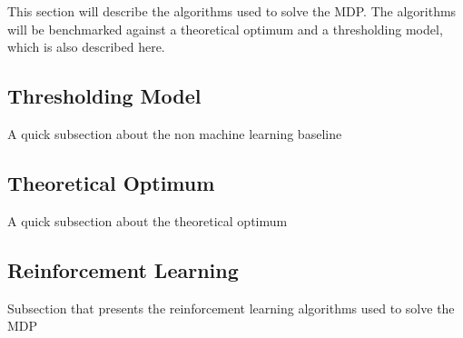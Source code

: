
This section will describe the algorithms used to solve the MDP. The algorithms will be benchmarked against a theoretical optimum and a thresholding model, which is also described here.
\subsection{Thresholding Model}
A quick subsection about the non machine learning baseline
\subsection{Theoretical Optimum}
A quick subsection about the theoretical optimum
\subsection{Reinforcement Learning}
Subsection that presents the reinforcement learning algorithms used to solve the MDP
